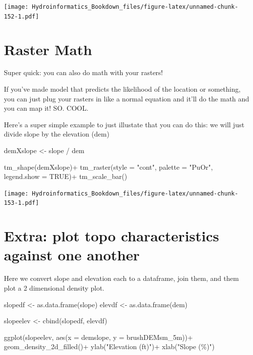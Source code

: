 \documentclass[
]{book}
\newenvironment{Shaded}{\begin{snugshade}}{\end{snugshade}}
\newcommand{\AttributeTok}[1]{\textcolor[rgb]{0.77,0.63,0.00}{#1}}
\newcommand{\ConstantTok}[1]{\textcolor[rgb]{0.00,0.00,0.00}{#1}}
\newcommand{\FunctionTok}[1]{\textcolor[rgb]{0.00,0.00,0.00}{#1}}
\newcommand{\NormalTok}[1]{#1}
\newcommand{\OtherTok}[1]{\textcolor[rgb]{0.56,0.35,0.01}{#1}}
\newcommand{\SpecialCharTok}[1]{\textcolor[rgb]{0.00,0.00,0.00}{#1}}
\newcommand{\StringTok}[1]{\textcolor[rgb]{0.31,0.60,0.02}{#1}}
\begin{document}
\texttt{[image: Hydroinformatics\_Bookdown\_files/figure-latex/unnamed-chunk-152-1.pdf]}

\hypertarget{raster-math}{%
\section{Raster Math}\label{raster-math}}

Super quick: you can also do math with your rasters!

If you've made model that predicts the likelihood of the location or something, you can just plug your rasters in like a normal equation and it'll do the math and you can map it! SO. COOL.

Here's a super simple example to just illustate that you can do this: we will just divide slope by the elevation (dem)

\begin{Shaded}
\begin{Highlighting}[]
\NormalTok{demXslope }\OtherTok{\textless{}{-}}\NormalTok{ slope }\SpecialCharTok{/}\NormalTok{ dem}

\FunctionTok{tm\_shape}\NormalTok{(demXslope)}\SpecialCharTok{+}
  \FunctionTok{tm\_raster}\NormalTok{(}\AttributeTok{style =} \StringTok{"cont"}\NormalTok{, }\AttributeTok{palette =} \StringTok{"PuOr"}\NormalTok{, }\AttributeTok{legend.show =} \ConstantTok{TRUE}\NormalTok{)}\SpecialCharTok{+}
  \FunctionTok{tm\_scale\_bar}\NormalTok{()}
\end{Highlighting}
\end{Shaded}

\texttt{[image: Hydroinformatics\_Bookdown\_files/figure-latex/unnamed-chunk-153-1.pdf]}

\hypertarget{extra-plot-topo-characteristics-against-one-another}{%
\section{Extra: plot topo characteristics against one another}\label{extra-plot-topo-characteristics-against-one-another}}

Here we convert slope and elevation each to a dataframe, join them, and them plot a 2 dimensional density plot.

\begin{Shaded}
\begin{Highlighting}[]
\NormalTok{slopedf }\OtherTok{\textless{}{-}} \FunctionTok{as.data.frame}\NormalTok{(slope)}
\NormalTok{elevdf }\OtherTok{\textless{}{-}} \FunctionTok{as.data.frame}\NormalTok{(dem)}

\NormalTok{slopeelev }\OtherTok{\textless{}{-}} \FunctionTok{cbind}\NormalTok{(slopedf, elevdf)}

\FunctionTok{ggplot}\NormalTok{(slopeelev, }\FunctionTok{aes}\NormalTok{(}\AttributeTok{x =}\NormalTok{ demslope, }\AttributeTok{y =}\NormalTok{ brushDEMsm\_5m))}\SpecialCharTok{+}
  \FunctionTok{geom\_density\_2d\_filled}\NormalTok{()}\SpecialCharTok{+}
  \FunctionTok{ylab}\NormalTok{(}\StringTok{"Elevation (ft)"}\NormalTok{)}\SpecialCharTok{+}
  \FunctionTok{xlab}\NormalTok{(}\StringTok{"Slope (\%)"}\NormalTok{)}
\end{Highlighting}
\end{Shaded}
\end{document}
